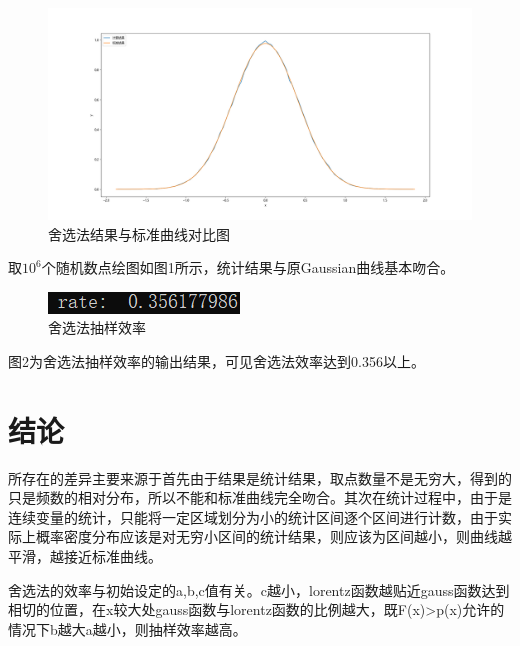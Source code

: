 \documentclass{article}
\begin{document}
	\begin{figure}[!h]
		
		\centering
		\includegraphics[scale=0.36]{compare}
		\caption{\heiti{}舍选法结果与标准曲线对比图}
		
	\end{figure}
	取$ 10^6 $个随机数点绘图如图1所示，统计结果与原Gaussian曲线基本吻合。
	\begin{figure}[!h]
	
	\centering
	\includegraphics[scale=1]{result_3_6}
	\caption{\heiti{}舍选法抽样效率}
	
\end{figure}


	图2为舍选法抽样效率的输出结果，可见舍选法效率达到0.356以上。
	\section{结论}
所存在的差异主要来源于首先由于结果是统计结果，取点数量不是无穷大，得到的只是频数的相对分布，所以不能和标准曲线完全吻合。其次在统计过程中，由于是连续变量的统计，只能将一定区域划分为小的统计区间逐个区间进行计数，由于实际上概率密度分布应该是对无穷小区间的统计结果，则应该为区间越小，则曲线越平滑，越接近标准曲线。


舍选法的效率与初始设定的a,b,c值有关。c越小，lorentz函数越贴近gauss函数达到相切的位置，在x较大处gauss函数与lorentz函数的比例越大，既F(x)>p(x)允许的情况下b越大a越小，则抽样效率越高。
\end{document}
